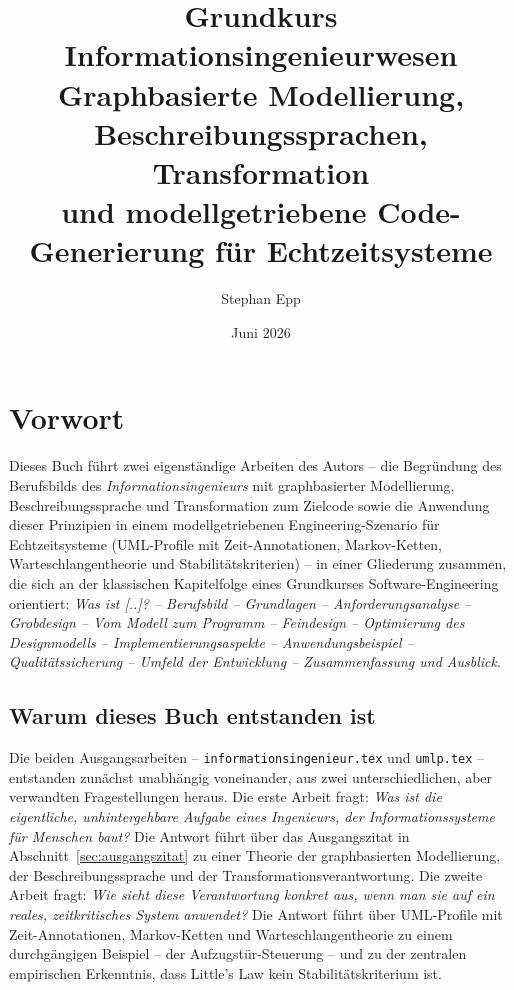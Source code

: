 ﻿\documentclass[a4paper,12pt]{report}
\title{\textbf{Grundkurs Informationsingenieurwesen}\\[0.5em]
\large Graphbasierte Modellierung, Beschreibungssprachen, Transformation\\
und modellgetriebene Code-Generierung für Echtzeitsysteme}
\author{Stephan Epp}
\date{Juni 2026}
\theoremstyle{definition}
\begin{document}
\sloppy

\maketitle

\tableofcontents

\chapter*{Vorwort}

Dieses Buch führt zwei eigenständige Arbeiten des Autors -- die Begründung
des Berufsbilds des \emph{Informationsingenieurs} mit graphbasierter
Modellierung, Beschreibungssprache und Transformation zum Zielcode sowie
die Anwendung dieser Prinzipien in einem modellgetriebenen
Engineering-Szenario für Echtzeitsysteme (UML-Profile mit
Zeit-Annotationen, Markov-Ketten, Warteschlangentheorie und
Stabilitätskriterien) -- in einer Gliederung zusammen, die sich an der
klassischen Kapitelfolge eines Grundkurses Software-Engineering
orientiert: \emph{Was ist [..]? -- Berufsbild -- Grundlagen --
Anforderungsanalyse -- Grobdesign -- Vom Modell zum Programm --
Feindesign -- Optimierung des Designmodells -- Implementierungsaspekte --
Anwendungsbeispiel -- Qualitätssicherung -- Umfeld der Entwicklung --
Zusammenfassung und Ausblick}.

\section*{Warum dieses Buch entstanden ist}

Die beiden Ausgangsarbeiten -- \texttt{informationsingenieur.tex} und
\texttt{umlp.tex} -- entstanden zunächst unabhängig voneinander, aus zwei
unterschiedlichen, aber verwandten Fragestellungen heraus. Die erste Arbeit
fragt: \emph{Was ist die eigentliche, unhintergehbare Aufgabe eines
Ingenieurs, der Informationssysteme für Menschen baut?} Die Antwort führt
über das Ausgangszitat in Abschnitt~\ref{sec:ausgangszitat} zu einer
Theorie der graphbasierten Modellierung, der Beschreibungssprache und der
Transformationsverantwortung. Die zweite Arbeit fragt: \emph{Wie sieht diese
Verantwortung konkret aus, wenn man sie auf ein reales, zeitkritisches
System anwendet?} Die Antwort führt über UML-Profile mit
Zeit-Annotationen, Markov-Ketten und Warteschlangentheorie zu einem
durchgängigen Beispiel -- der Aufzugstür-Steuerung -- und zu der zentralen
empirischen Erkenntnis, dass Little's Law kein Stabilitätskriterium ist.
\end{document}
